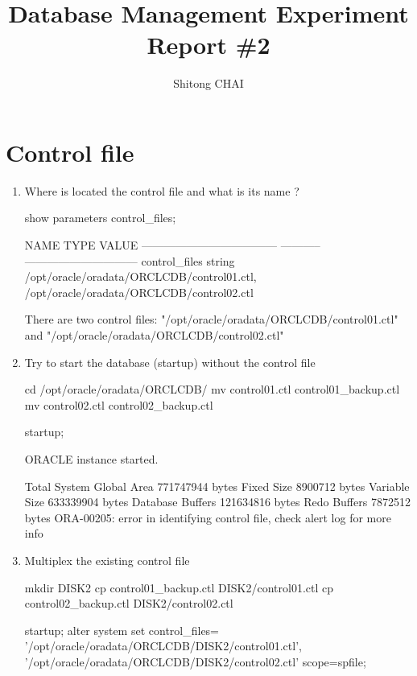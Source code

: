 \documentclass{article}
\title{Database Management Experiment Report \#2}
\author{Shitong CHAI}
\date{\vspace{-5ex}}
\begin{document}
\maketitle
\section{Control file}
\begin{enumerate}
\item Where is located the control file and what is its name ?
\begin{sqlshell}
show parameters control_files;
\end{sqlshell}
\begin{messageshell}
NAME                                 TYPE        VALUE
------------------------------------ ----------- ------------------------------
control_files                          string        /opt/oracle/oradata/ORCLCDB/control01.ctl, /opt/oracle/oradata/ORCLCDB/control02.ctl

\end{messageshell}
There are two control files: "/opt/oracle/oradata/ORCLCDB/control01.ctl" and "/opt/oracle/oradata/ORCLCDB/control02.ctl"

\item Try to start the database (startup) without the control file
\begin{commandshell}
cd /opt/oracle/oradata/ORCLCDB/
mv control01.ctl control01_backup.ctl
mv control02.ctl control02_backup.ctl
\end{commandshell}
\begin{sqlshell}
startup;
\end{sqlshell}
\begin{messageshell}
ORACLE instance started.

Total System Global Area  771747944 bytes
Fixed Size                  8900712 bytes
Variable Size                633339904 bytes
Database Buffers         121634816 bytes
Redo Buffers                  7872512 bytes
ORA-00205: error in identifying control file, check alert log for more info

\end{messageshell}
\item Multiplex the existing control file
\begin{commandshell}
mkdir DISK2
cp control01_backup.ctl DISK2/control01.ctl
cp control02_backup.ctl DISK2/control02.ctl
\end{commandshell}
\begin{sqlshell}
startup;
alter system set control_files= '/opt/oracle/oradata/ORCLCDB/DISK2/control01.ctl', '/opt/oracle/oradata/ORCLCDB/DISK2/control02.ctl' scope=spfile;
\end{sqlshell}
\begin{messageshell}


\end{messageshell}
\end{enumerate}
\end{document}
